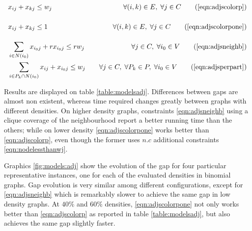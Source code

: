 \begin{align*}
&x_{ij} + x_{kj} \leq w_j \sumheight &\quad \forall (i,k) \in E, \; \forall j \in C \tag{\ref{eqn:adjscolorp}} \\
&x_{ij} + x_{kj} \leq 1 \sumheight &\quad \forall (i,k) \in E, \; \forall j \in C \tag{\ref{eqn:adjscolorpone}} \\
&\sum_{i \in N(i_0)} x_{i_0j} + r x_{i_0j} \leq r w_j &\quad \forall j \in C, \; \forall i_0 \in V \tag{\ref{eqn:adjsneighb}} \\
&\sum_{i \in P_k \cap N(i_0)} x_{ij} + x_{i_0j} \leq w_j &\quad \forall j \in C, \; \forall P_k \in P, \; \forall i_0 \in V \tag{\ref{eqn:adjsperpart}} 
\end{align*}

Results are displayed on table \ref{table:modelsadj}. Differences between gaps are almost non existent, whereas time required changes greatly between graphs with different densities. On higher density graphs, constraints \ref{eqn:adjsneighb} using a clique coverage of the neighbourhood report a better running time than the others; while on lower density \ref{eqn:adjscolorpone} works better than \ref{eqn:adjscolorp}, even though the former uses $n.c$ additional constraints \ref{eqn:nodelessthanwj}.

Graphics \ref{fig:models:adj} show the evolution of the gap for four particular representative instances, one for each of the evaluated densities in binomial graphs. Gap evolution is very similar among different configurations, except for \ref{eqn:adjsneighb} which is remarkably slower to achieve the same gap in low density graphs. At $40\%$ and $60\%$ densities, \ref{eqn:adjscolorpone} not only works better than \ref{eqn:adjscolorp} as reported in table \ref{table:modelsadj}, but also achieves the same gap slightly faster.

